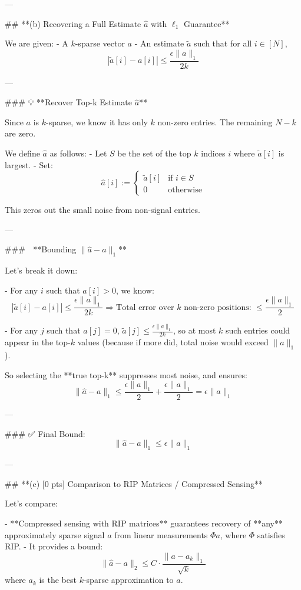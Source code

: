 \begin{enumerate}
\begin{shaded}
  ---
  
  ## **(b) Recovering a Full Estimate \(\hat{a}\) with \(\ell_1\) Guarantee**
  
  We are given:
  - A \(k\)-sparse vector \(a\)
  - An estimate \(\tilde{a}\) such that for all \(i \in [N]\),
  \[
  |\tilde{a}[i] - a[i]| \le \frac{\epsilon \|a\|_1}{2k}
  \]
  
  ---
  
  ### 💡 **Recover Top-k Estimate \(\hat{a}\)**
  
  Since \(a\) is \(k\)-sparse, we know it has only \(k\) non-zero entries. The remaining \(N - k\) are zero.
  
  We define \(\hat{a}\) as follows:
  - Let \(S\) be the set of the top \(k\) indices \(i\) where \(\tilde{a}[i]\) is largest.
  - Set:
	\[
	\hat{a}[i] := \begin{cases}
	\tilde{a}[i] & \text{if } i \in S \\
	0 & \text{otherwise}
	\end{cases}
	\]
  
  This zeros out the small noise from non-signal entries.
  
  ---
  
  ### 🧮 **Bounding \(\|\hat{a} - a\|_1\)**
  
  Let's break it down:
  
  - For any \(i\) such that \(a[i] > 0\), we know:
  \[
  |\tilde{a}[i] - a[i]| \le \frac{\epsilon \|a\|_1}{2k}
  \Rightarrow \text{Total error over } k \text{ non-zero positions: } \le \frac{\epsilon \|a\|_1}{2}
  \]
  
  - For any \(j\) such that \(a[j] = 0\), \(\tilde{a}[j] \le \frac{\epsilon \|a\|_1}{2k}\), so at most \(k\) such entries could appear in the top-\(k\) values (because if more did, total noise would exceed \(\|a\|_1\)).
  
  So selecting the **true top-k** suppresses most noise, and ensures:
  \[
  \|\hat{a} - a\|_1 \le \frac{\epsilon \|a\|_1}{2} + \frac{\epsilon \|a\|_1}{2} = \epsilon \|a\|_1
  \]
  
  ---
  
  ### ✅ Final Bound:
  \[
  \boxed{ \|\hat{a} - a\|_1 \le \epsilon \|a\|_1 }
  \]
  
  ---
  
  ## **(c) [0 pts] Comparison to RIP Matrices / Compressed Sensing**
  
  Let's compare:
  
  - **Compressed sensing with RIP matrices** guarantees recovery of **any** approximately sparse signal \(a\) from linear measurements \(\Phi a\), where \(\Phi\) satisfies RIP.
  - It provides a bound:
  \[
  \|\hat{a} - a\|_2 \le C \cdot \frac{\|a - a_k\|_1}{\sqrt{k}}
  \]
  where \(a_k\) is the best \(k\)-sparse approximation to \(a\).
  

\end{shaded}
\end{enumerate}
